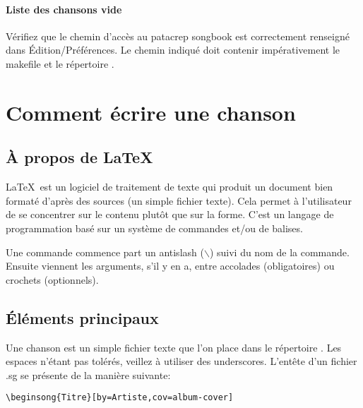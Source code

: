 \documentclass[versionenligne]{patacrep}
\begin{document}
\paragraph{Liste des chansons vide} Vérifiez que le chemin d'accès au
patacrep songbook est correctement renseigné dans Édition/Préférences.
Le chemin indiqué doit contenir impérativement le makefile et le
répertoire .


\section{Comment écrire une chanson}

\subsection{À propos de \LaTeX\,}

\LaTeX\, est un logiciel de traitement de texte qui produit un document
bien formaté d'après des sources (un simple fichier texte). Cela
permet à l'utilisateur de se concentrer sur le contenu plutôt que sur
la forme. C'est un langage de programmation basé sur un système de
commandes et/ou de balises.

Une commande commence part un antislash ($\backslash$) suivi du nom
de la commande. Ensuite viennent les arguments, s'il y en a, entre
accolades (obligatoires) ou crochets (optionnels).

\subsection{Éléments principaux}

Une chanson est un simple fichier texte  que l'on
place dans le répertoire . Les espaces n'étant
pas tolérés, veillez à utiliser des underscores. L'entête d'un fichier
.sg se présente de la manière suivante:

\begin{verbatim}
\beginsong{Titre}[by=Artiste,cov=album-cover]
\end{verbatim}
\end{document}
